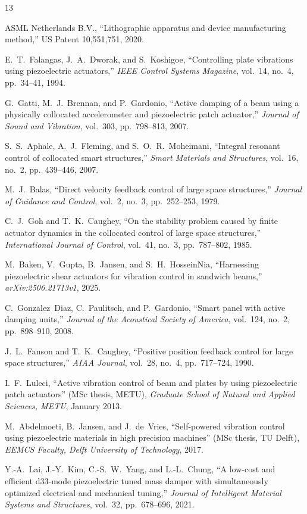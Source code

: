 \documentclass[12pt,a4paper]{article}
\begin{document}
\begin{thebibliography}{13}

ASML Netherlands B.V.,
``Lithographic apparatus and device manufacturing method,''
US Patent 10,551,751, 2020.

E.~T.~Falangas, J.~A.~Dworak, and S.~Koshigoe,
``Controlling plate vibrations using piezoelectric actuators,''
\textit{IEEE Control Systems Magazine}, vol.~14, no.~4, pp.~34--41, 1994.

G.~Gatti, M.~J.~Brennan, and P.~Gardonio,
``Active damping of a beam using a physically collocated accelerometer
and piezoelectric patch actuator,''
\textit{Journal of Sound and Vibration}, vol.~303, pp.~798--813, 2007.

S.~S.~Aphale, A.~J.~Fleming, and S.~O.~R.~Moheimani,
``Integral resonant control of collocated smart structures,''
\textit{Smart Materials and Structures}, vol.~16, no.~2, pp.~439--446, 2007.

M.~J.~Balas,
``Direct velocity feedback control of large space structures,''
\textit{Journal of Guidance and Control}, vol.~2, no.~3, pp.~252--253, 1979.

C.~J.~Goh and T.~K.~Caughey,
``On the stability problem caused by finite actuator dynamics in the collocated
control of large space structures,''
\textit{International Journal of Control}, vol.~41, no.~3, pp.~787--802, 1985.

M.~Baken, V.~Gupta, B.~Jansen, and S.~H.~HosseinNia,
``Harnessing piezoelectric shear actuators for vibration control in sandwich beams,''
\textit{arXiv:2506.21713v1}, 2025.

C.~Gonzalez~Diaz, C.~Paulitsch, and P.~Gardonio,
``Smart panel with active damping units,''
\textit{Journal of the Acoustical Society of America},
vol.~124, no.~2, pp.~898--910, 2008.

J.~L.~Fanson and T.~K.~Caughey,
``Positive position feedback control for large space structures,''
\textit{AIAA Journal}, vol.~28, no.~4, pp.~717--724, 1990.

I.~F.~Luleci,
``Active vibration control of beam and plates by using piezoelectric patch
actuators'' (MSc thesis, METU),
\textit{Graduate School of Natural and Applied Sciences, METU}, January 2013.

M.~Abdelmoeti, B.~Jansen, and J.~de~Vries,
``Self-powered vibration control using piezoelectric materials in high
precision machines'' (MSc thesis, TU Delft),
\textit{EEMCS Faculty, Delft University of Technology}, 2017.

Y.-A.~Lai, J.-Y.~Kim, C.-S.~W.~Yang, and L.-L.~Chung,
``A low-cost and efficient d33-mode piezoelectric tuned mass damper with
simultaneously optimized electrical and mechanical tuning,''
\textit{Journal of Intelligent Material Systems and Structures},
vol.~32, pp.~678--696, 2021.

\end{thebibliography}
\end{document}
